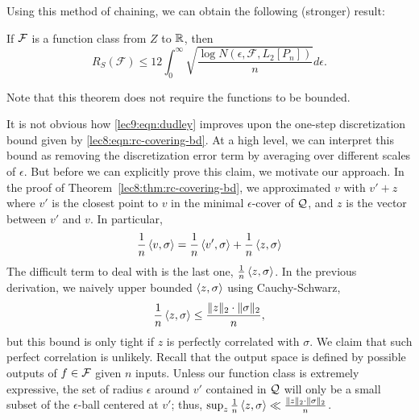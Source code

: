 Using this method of chaining, we can obtain the following (stronger) result:

\begin{theorem}
If $\mathcal F$ is a function class from $Z$ to $\mathbb R$, then
\begin{equation}
    R_S(\mathcal{F})\leq 12\int_{0}^{\infty}\sqrt{\frac{\log N(\epsilon, \mathcal{F}, L_2[P_n])}{n}}d\epsilon. \label{lec9:eqn:dudley}
\end{equation}
\end{theorem}

Note that this theorem does not require the functions to be bounded.

\begin{remark}

It is not obvious how \eqref{lec9:eqn:dudley} improves upon the one-step discretization bound given by \eqref{lec8:eqn:rc-covering-bd}. At a high level, we can interpret this bound as removing the discretization error term by averaging over different scales of $\epsilon$.  But before we can explicitly prove this claim, we motivate our approach. In the proof of Theorem~\ref{lec8:thm:rc-covering-bd}, we approximated $v$ with $v' + z$ where $v'$ is the closest point to $v$ in the minimal $\epsilon$-cover of $\mathcal Q$, and $z$ is the vector between $v'$ and $v$. In particular,
\begin{equation}
    \frac 1 n \left\langle v, \sigma\right\rangle = \frac 1 n \left\langle v', \sigma\right\rangle + \frac 1 n \left\langle z, \sigma\right\rangle \label{lec9:eqn:disc_decomp}
\end{equation}
The difficult term to deal with is the last one, $\frac 1 n \left\langle z, \sigma\right\rangle$. In the previous derivation, we naively upper bounded $\left\langle z, \sigma\right\rangle$ using Cauchy-Schwarz,
\begin{equation}
    \frac 1 n \left\langle z,\sigma\right\rangle \le \frac{\|z\|_2\cdot \|\sigma\|_2} n,
\end{equation}
but this bound is only tight if $z$ is perfectly correlated with $\sigma$. We claim that such perfect correlation is unlikely. Recall that the output space is defined by possible outputs of $f \in \mathcal F$ given $n$ inputs. Unless our function class is extremely expressive, the set of radius $\epsilon$ around $v'$ contained in $\mathcal Q$ will only be a small subset of the $\epsilon$-ball centered at $v'$; thus, $\sup_{z} \frac{1}{n} \left\langle z, \sigma\right\rangle \ll \frac{\|z\|_2 \cdot \|\sigma\|_2}{n}$.


\end{remark}

